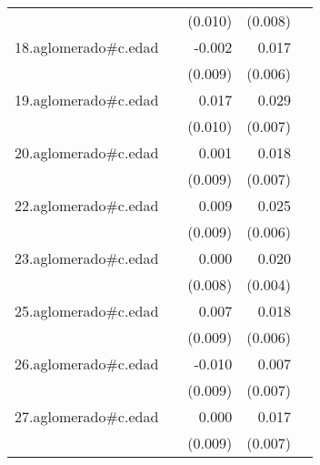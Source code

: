 {\begin{longtable}{l*{4}{D{.}{.}{-1}}}
            &                     &     (0.010)         &     (0.008)         &                     \\
\addlinespace
18.aglomerado#c.edad&                     &      -0.002         &       0.017\sym{**} &                     \\
            &                     &     (0.009)         &     (0.006)         &                     \\
\addlinespace
19.aglomerado#c.edad&                     &       0.017         &       0.029\sym{***}&                     \\
            &                     &     (0.010)         &     (0.007)         &                     \\
\addlinespace
20.aglomerado#c.edad&                     &       0.001         &       0.018\sym{*}  &                     \\
            &                     &     (0.009)         &     (0.007)         &                     \\
\addlinespace
22.aglomerado#c.edad&                     &       0.009         &       0.025\sym{***}&                     \\
            &                     &     (0.009)         &     (0.006)         &                     \\
\addlinespace
23.aglomerado#c.edad&                     &       0.000         &       0.020\sym{***}&                     \\
            &                     &     (0.008)         &     (0.004)         &                     \\
\addlinespace
25.aglomerado#c.edad&                     &       0.007         &       0.018\sym{**} &                     \\
            &                     &     (0.009)         &     (0.006)         &                     \\
\addlinespace
26.aglomerado#c.edad&                     &      -0.010         &       0.007         &                     \\
            &                     &     (0.009)         &     (0.007)         &                     \\
\addlinespace
27.aglomerado#c.edad&                     &       0.000         &       0.017\sym{*}  &                     \\
            &                     &     (0.009)         &     (0.007)         &                     \\

\end{longtable}}
